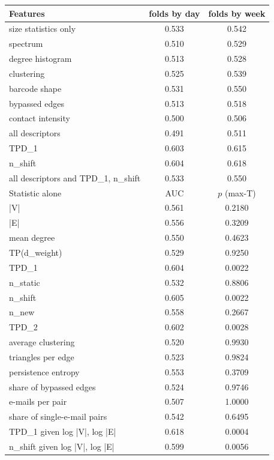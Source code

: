 \begin{tabular}{@{}lcc@{}}
\toprule
Features & folds by day & folds by week\\
\midrule
size statistics only & 0.533 & 0.542\\
spectrum & 0.510 & 0.529\\
degree histogram & 0.513 & 0.528\\
clustering & 0.525 & 0.539\\
barcode shape & 0.531 & 0.550\\
bypassed edges & 0.513 & 0.518\\
contact intensity & 0.500 & 0.506\\
all descriptors & 0.491 & 0.511\\
TPD_1 & 0.603 & 0.615\\
n_shift & 0.604 & 0.618\\
all descriptors and TPD_1, n_shift & 0.533 & 0.550\\
\midrule
Statistic alone & AUC & $p$ (max-T)\\
\midrule
|V| & 0.561 & 0.2180\\
|E| & 0.556 & 0.3209\\
mean degree & 0.550 & 0.4623\\
TP(d_weight) & 0.529 & 0.9250\\
TPD_1 & 0.604 & 0.0022\\
n_static & 0.532 & 0.8806\\
n_shift & 0.605 & 0.0022\\
n_new & 0.558 & 0.2667\\
TPD_2 & 0.602 & 0.0028\\
average clustering & 0.520 & 0.9930\\
triangles per edge & 0.523 & 0.9824\\
persistence entropy & 0.553 & 0.3709\\
share of bypassed edges & 0.524 & 0.9746\\
e-mails per pair & 0.507 & 1.0000\\
share of single-e-mail pairs & 0.542 & 0.6495\\
TPD_1 given log |V|, log |E| & 0.618 & 0.0004\\
n_shift given log |V|, log |E| & 0.599 & 0.0056\\
\bottomrule
\end{tabular}
